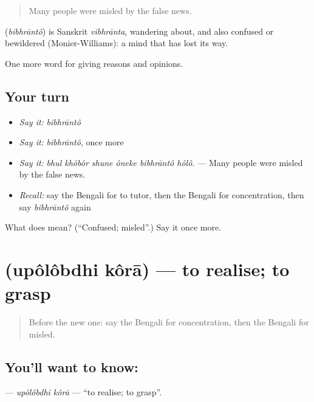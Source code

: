 \begin{quote}
Many people were misled by the false news.
\end{quote}

\begin{cousinweb}
\textbf{} (\emph{bibhrāntô}) is Sanskrit \emph{vibhrānta}, wandering about, and also confused or bewildered (Monier-Williams): a mind that has lost its way.
\end{cousinweb}

\begin{grammarlens}[title={What you've built}]
One more word for giving reasons and opinions.
\end{grammarlens}

\subsection*{Your turn}
\begin{itemize}
\raggedright
  \item \emph{Say it:} \emph{bibhrāntô}
  \item \emph{Say it:} \emph{bibhrāntô}, once more
  \item \emph{Say it:} \emph{bhul khôbôr shune ôneke bibhrāntô hôlô.} — Many people were misled by the false news.
  \item \emph{Recall:} say the Bengali for to tutor, then the Bengali for concentration, then say \emph{bibhrāntô} again
\end{itemize}

\begin{tcolorbox}[breakable,colback=teal!4,colframe=teal!35!black,title={Before you move on}]
What does  mean? (\textquotedblleft{}Confused; misled\textquotedblright{}.) Say it once more.
\end{tcolorbox}
\section[\texorpdfstring{\bn{উপলব্ধি} \bn{করা} (upôlôbdhi kôrā)}{উপলব্ধি করা (upôlôbdhi kôrā)}]{  (upôlôbdhi kôrā) — to realise; to grasp}

\label{lesson:BN-C362-upolobdhi-kora}



\begin{quote}
Before the new one: say the Bengali for concentration, then the Bengali for misled.
\end{quote}

\subsection*{You'll want to know:  }
\textbf{ } — \emph{upôlôbdhi kôrā} — \textquotedblleft{}to realise; to grasp\textquotedblright{}.

